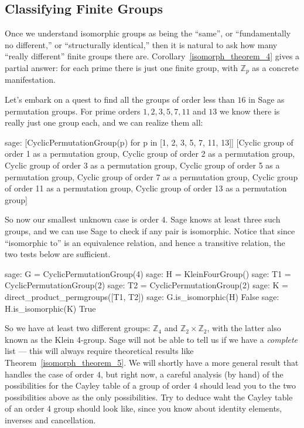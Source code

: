 \subsection{Classifying Finite Groups}
%
Once we understand isomorphic groups as being the ``same'', or ``fundamentally no different,'' or ``structurally identical,'' then it is natural to ask how many ``really different'' finite groups there are.  Corollary~\ref{isomorph_theorem_4} gives a partial answer: for each prime there is just one finite group, with ${\mathbb Z}_p$ as a concrete manifestation.\par
%
Let's embark on a quest to find all the groups of order less than $16$ in Sage as permutation groups.  For prime orders $1,2,3,5,7,11$ and $13$ we know there is really just one group each, and we can realize them all:
%
\begin{sageexample}
sage: [CyclicPermutationGroup(p) for p in [1, 2, 3, 5, 7, 11, 13]]
[Cyclic group of order 1 as a permutation group,
 Cyclic group of order 2 as a permutation group,
 Cyclic group of order 3 as a permutation group,
 Cyclic group of order 5 as a permutation group,
 Cyclic group of order 7 as a permutation group,
 Cyclic group of order 11 as a permutation group,
 Cyclic group of order 13 as a permutation group]
\end{sageexample}
%
So now our smallest unknown case is order $4$.  Sage knows at least three such groups, and we can use Sage to check if any pair is isomorphic.  Notice that since ``isomorphic to'' is an equivalence relation, and hence a transitive relation, the two tests below are sufficient.
%
\begin{sageexample}
sage: G = CyclicPermutationGroup(4)
sage: H = KleinFourGroup()
sage: T1 = CyclicPermutationGroup(2)
sage: T2 = CyclicPermutationGroup(2)
sage: K = direct_product_permgroups([T1, T2])
sage: G.is_isomorphic(H)
False
sage: H.is_isomorphic(K)
True
\end{sageexample}
%
So we have at least two different groups: ${\mathbb Z}_4$ and ${\mathbb Z}_2\times{\mathbb Z}_2$, with the latter also known as the Klein 4-group.  Sage will not be able to tell us if we have a \emph{complete} list --- this will always require theoretical results like Theorem~\ref{isomorph_theorem_5}.  We will shortly have a more general result that handles the case of order $4$, but right now, a careful analysis (by hand) of the possibilities for the Cayley table of a group of order 4 should lead you to the two possibilities above as the only possibilities.  Try to deduce waht the Cayley table of an order 4 group should look like, since you know about identity elements, inverses and cancellation.\par
